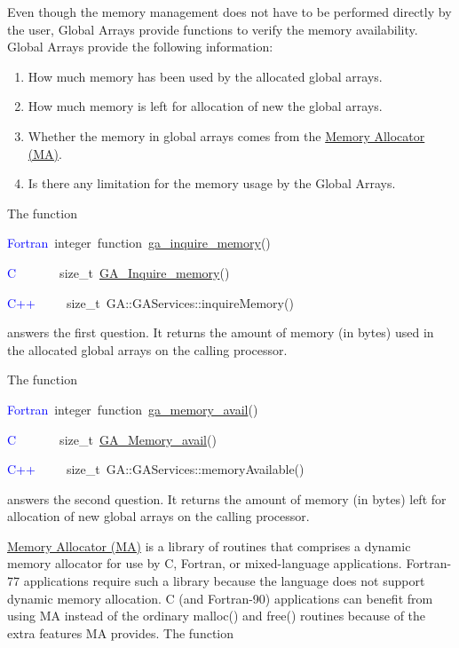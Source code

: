 Even though the memory management does not have to be performed directly
by the user, Global Arrays provide functions to verify the memory
availability. Global Arrays provide the following information:
\begin{enumerate}
\item How much memory has been used by the allocated global arrays. 
\item How much memory is left for allocation of new the global arrays. 
\item Whether the memory in global arrays comes from the \href{https://hpc.pnl.gov/globalarrays/ma/MAapi.html}{Memory Allocator (MA)}. 
\item Is there any limitation for the memory usage by the Global Arrays.
\end{enumerate}
The function

\textcolor{blue}{Fortran~}integer~function~\href{https://hpc.pnl.gov/globalarrays/api/f_op_api.html\#ga_inquire_memory}{ga\_{}inquire\_{}memory}()~

\textcolor{blue}{C}~~~~~~~size\_t~\href{https://hpc.pnl.gov/globalarrays/api/c_op_api.html\#ga_inquire_memory}{GA\_{}Inquire\_{}memory}()~

\textcolor{blue}{C++~}~~~~size\_t~GA::GAServices::inquireMemory()

answers the first question. It returns the amount of memory (in bytes)
used in the allocated global arrays on the calling processor.

The function

\textcolor{blue}{Fortran}~integer~function~\href{https://hpc.pnl.gov/globalarrays/api/f_op_api.html\#ga_memory_avail}{ga\_{}memory\_{}avail}()~

\textcolor{blue}{C}~~~~~~~size\_t~\href{https://hpc.pnl.gov/globalarrays/api/c_op_api.html\#ga_memory_avail}{GA\_{}Memory\_{}avail}()~

\textcolor{blue}{C++}~~~~~size\_t~GA::GAServices::memoryAvailable()

answers the second question. It returns the amount of memory (in bytes)
left for allocation of new global arrays on the calling processor.

\href{https://hpc.pnl.gov/globalarrays/ma/MAapi.html}{Memory Allocator (MA)}
is a library of routines that comprises a dynamic memory allocator
for use by C, Fortran, or mixed-language applications. Fortran- 77
applications require such a library because the language does not
support dynamic memory allocation. C (and Fortran-90) applications
can benefit from using MA instead of the ordinary malloc() and free()
routines because of the extra features MA provides. The function

